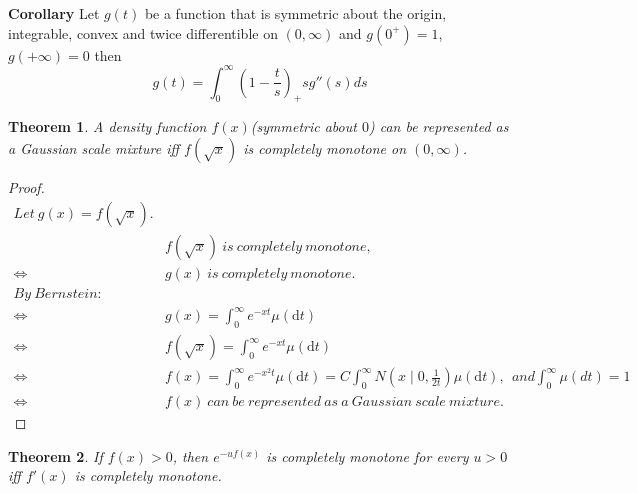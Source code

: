 \documentclass[11pt]{article}
\newtheorem{theorem}{Theorem}[section]
\begin{document}
\textbf{Corollary}
Let $g(t)$ be a function that is symmetric about the origin, integrable, convex and twice differentible on $(0, \infty)$ and $g(0^+) = 1$, $g(+\infty) = 0$ then
\[ g(t) = \int_0^{\infty}(1-\frac{t}{s})_+ s g''(s) ds \]

\begin{theorem}
A density function $f(x)$(symmetric about $0$) can be represented as a Gaussian scale mixture iff $f(\sqrt{x})$ is completely monotone on $(0, \infty)$.
\end{theorem}

\begin{proof}
\[\begin{split}
Let~g(x) = f(\sqrt{x}).\\ 
& f(\sqrt{x})~is~completely~monotone,\\ 
\Longleftrightarrow & g(x)~is~completely~monotone.\\
By~Bernstein:\\
\Longleftrightarrow & g(x) = \int_{0}^{\infty}e^{-xt}\mu(\mathrm{d}t)\\
\Longleftrightarrow & f(\sqrt{x}) = \int_{0}^{\infty}e^{-xt}\mu(\mathrm{d}t)\\
\Longleftrightarrow & f(x) = \int_{0}^{\infty}e^{-x^2t}\mu(\mathrm{d}t) = C\int_{0}^{\infty}N(x\mid0, \frac{1}{2t})\mu(\mathrm{d}t),
~~and
\int_{0}^{\infty}\mu(dt) = 1\\
\Longleftrightarrow & f(x)~can~be~represented~as~a~Gaussian~scale~mixture.
\end{split}\]
\end{proof}

\begin{theorem}
If $f(x) > 0$, then $e^{-uf(x)}$ is completely monotone for every $u>0$ iff $f'(x)$ is completely monotone.
\end{theorem}
\end{document}
